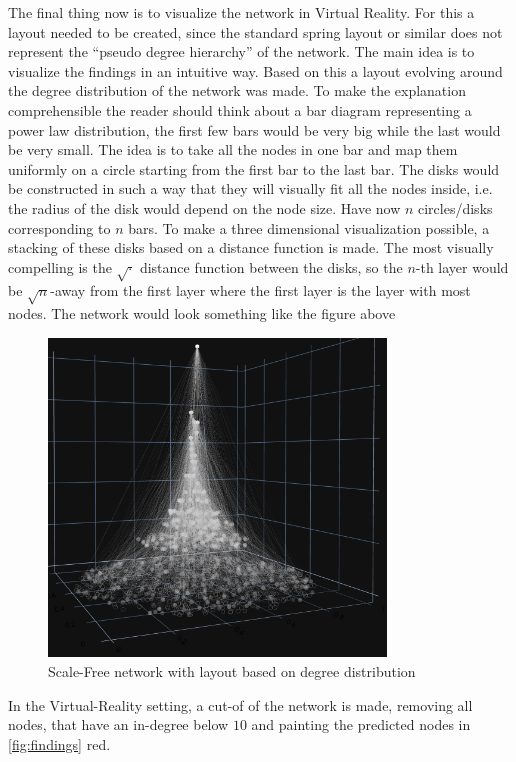 \documentclass[a4paper]{article}
\begin{document}
The final thing now is to visualize the network in Virtual Reality. For this
a layout needed to be created, since the standard spring layout or similar
does not represent the ``pseudo degree hierarchy'' of the network. The main idea is
to visualize the findings in an intuitive way. Based on this a layout
evolving around the degree distribution of the network was made. To make the
explanation comprehensible the reader should think about a bar diagram
representing a power law distribution, the first few bars would be
very big while the last would be very small. The idea is to take all the
nodes in one bar and map them uniformly on a circle starting from the first
bar to the last bar. The disks would be constructed in such a way that they
will visually fit all the nodes inside, i.e. the radius of the disk would
depend on the node size. Have now $n$ circles/disks corresponding to $n$
bars. To make a three dimensional visualization possible, a stacking of these
disks based on a distance function is made. The most visually compelling is
the $\sqrt{\cdot}$ distance function between the disks, so the $n$-th layer
would be $\sqrt{n}$-away from the first layer where the first layer is the
layer with most nodes. The network would look something like the figure above
\begin{figure}[H]
    \centering
    \includegraphics[width=0.8\textwidth]{../pres/pics/plot_sqrt.png}
    \caption{Scale-Free network with layout based on degree distribution}
\end{figure}

In the Virtual-Reality setting, a cut-of of the network is made, removing all
nodes, that have an in-degree below $10$ and painting the predicted nodes in
\ref{fig:findings} red.
\end{document}
